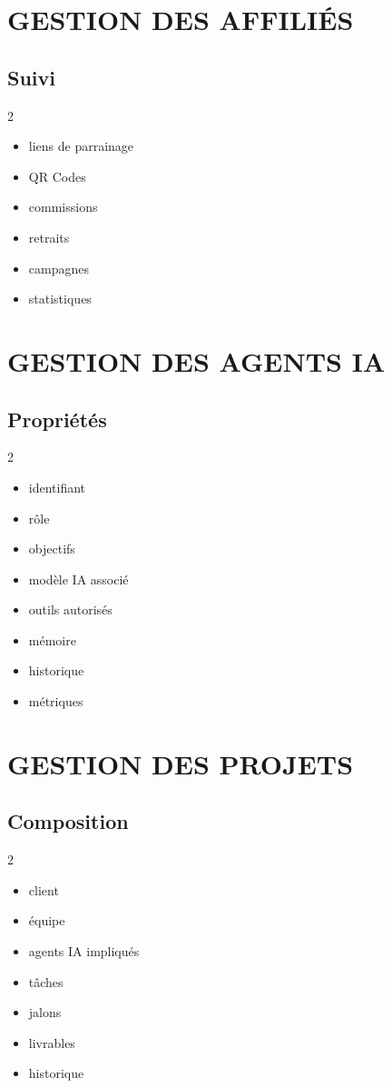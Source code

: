 \documentclass[12pt,a4paper,oneside]{book}
\begin{document}
\chapter{GESTION DES AFFILIÉS}

\section{Suivi}
\begin{multicols}{2}
\begin{itemize}
\item liens de parrainage
\item QR Codes
\item commissions
\item retraits
\item campagnes
\item statistiques
\end{itemize}
\end{multicols}

\chapter{GESTION DES AGENTS IA}

\section{Propriétés}
\begin{multicols}{2}
\begin{itemize}
\item identifiant
\item rôle
\item objectifs
\item modèle IA associé
\item outils autorisés
\item mémoire
\item historique
\item métriques
\end{itemize}
\end{multicols}

\chapter{GESTION DES PROJETS}

\section{Composition}
\begin{multicols}{2}
\begin{itemize}
\item client
\item équipe
\item agents IA impliqués
\item tâches
\item jalons
\item livrables
\item historique
\end{itemize}
\end{multicols}
\end{document}
